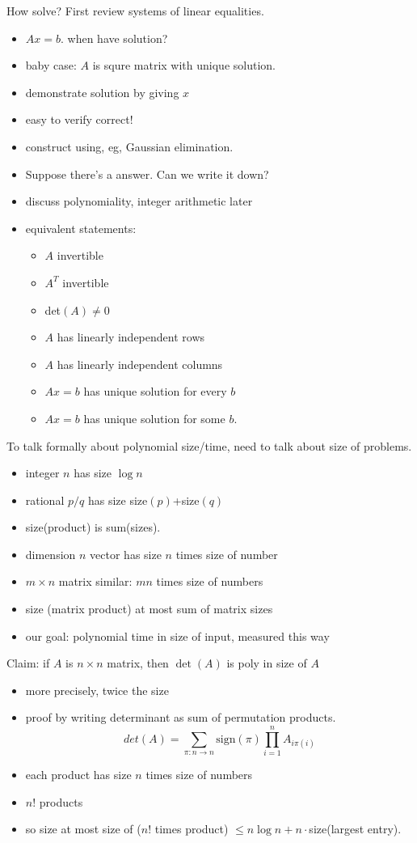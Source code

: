 \documentclass{article}
\begin{document}
How solve?  First review systems of linear equalities.
\begin{itemize}
\item $Ax=b$.  when have solution?
\item baby case: $A$ is squre matrix with unique solution.  
\item demonstrate solution by giving $x$
\item easy to verify correct!
\item construct using, eg, Gaussian elimination.
\item Suppose there's a answer.  Can we write it down?
\item discuss polynomiality, integer arithmetic later
\item equivalent statements:
  \begin{itemize}
  \item $A$ invertible
  \item $A^T$ invertible
  \item det$(A)\ne 0$
  \item $A$ has linearly independent rows
  \item $A$ has linearly independent columns
  \item $Ax=b$ has unique solution for every $b$
  \item $Ax=b$ has unique solution for some $b$.
  \end{itemize}
\end{itemize}

To talk formally about polynomial size/time, need to talk about size of
problems.
\begin{itemize}
\item integer $n$ has size $\log n$
\item rational $p/q$ has size size$(p)$+size$(q)$
\item size(product) is sum(sizes).
\item dimension $n$ vector has size $n$ times size of number
\item $m \times n$ matrix similar: $mn$ times size of numbers
\item size (matrix product) at most sum of matrix sizes
\item our goal: polynomial time in size of input, measured this way
\end{itemize}

Claim: if $A$ is $n \times n$ matrix, then $\det(A)$ is poly in size of $A$
\begin{itemize}
\item more precisely, twice the size
\item proof by writing determinant as sum of permutation products.
\[
det(A)=\sum_{\pi:n\rightarrow n} \textrm{sign}(\pi)\prod_{i=1}^{n} A_{i\pi(i)}
\]
\item each product has size $n$ times size of numbers
\item $n!$ products
\item so size at most size of ($n!$ times product) $\le n\log
  n+n\cdot$size(largest entry).
\end{itemize}
\end{document}
